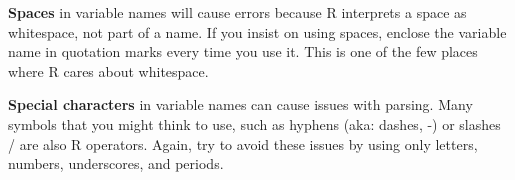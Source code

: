 \documentclass[
  13,
  letterpaper,
]{report}
\newenvironment{Shaded}{\begin{snugshade}}{\end{snugshade}}
\newcommand{\CommentTok}[1]{\textcolor[rgb]{0.37,0.37,0.37}{#1}}
\newcommand{\DecValTok}[1]{\textcolor[rgb]{0.68,0.00,0.00}{#1}}
\newcommand{\FunctionTok}[1]{\textcolor[rgb]{0.28,0.35,0.67}{#1}}
\newcommand{\NormalTok}[1]{\textcolor[rgb]{0.00,0.23,0.31}{#1}}
\newcommand{\OtherTok}[1]{\textcolor[rgb]{0.00,0.23,0.31}{#1}}
\newcommand{\SpecialCharTok}[1]{\textcolor[rgb]{0.37,0.37,0.37}{#1}}
\newcommand{\StringTok}[1]{\textcolor[rgb]{0.13,0.47,0.30}{#1}}
\begin{document}
\textbf{Spaces} in variable names will cause errors because R interprets
a space as whitespace, not part of a name. If you insist on using
spaces, enclose the variable name in quotation marks every time you use
it. This is one of the few places where R cares about whitespace.

\begin{Shaded}
\end{Shaded}

\textbf{Special characters} in variable names can cause issues with
parsing. Many symbols that you might think to use, such as hyphens (aka:
dashes, -) or slashes / are also R operators. Again, try to avoid these
issues by using only letters, numbers, underscores, and periods.

\begin{Shaded}
\end{Shaded}
\end{document}
